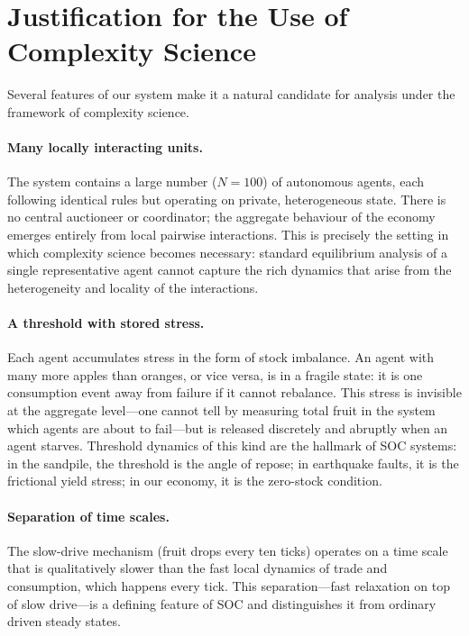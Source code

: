 \documentclass[11pt,a4paper]{article}
\begin{document}
\section{Justification for the Use of Complexity Science}

Several features of our system make it a natural candidate for analysis
under the framework of complexity science.

\paragraph{Many locally interacting units.} The system contains a large
number ($N=100$) of autonomous agents, each following identical rules but
operating on private, heterogeneous state. There is no central auctioneer
or coordinator; the aggregate behaviour of the economy emerges entirely
from local pairwise interactions. This is precisely the setting in which
complexity science becomes necessary: standard equilibrium analysis of a
single representative agent cannot capture the rich dynamics that arise
from the heterogeneity and locality of the interactions.

\paragraph{A threshold with stored stress.} Each agent accumulates stress
in the form of stock imbalance. An agent with many more apples than
oranges, or vice versa, is in a fragile state: it is one consumption event
away from failure if it cannot rebalance. This stress is invisible at the
aggregate level---one cannot tell by measuring total fruit in the system
which agents are about to fail---but is released discretely and abruptly
when an agent starves. Threshold dynamics of this kind are the hallmark of
SOC systems: in the sandpile, the threshold is the angle of repose; in
earthquake faults, it is the frictional yield stress; in our economy, it is
the zero-stock condition.

\paragraph{Separation of time scales.} The slow-drive mechanism (fruit
drops every ten ticks) operates on a time scale that is qualitatively
slower than the fast local dynamics of trade and consumption, which
happens every tick. This separation---fast relaxation on top of slow
drive---is a defining feature of SOC and distinguishes it from ordinary
driven steady states.
\end{document}
